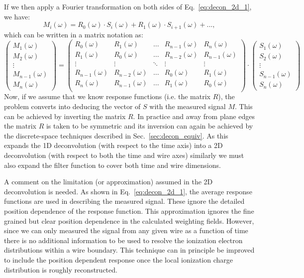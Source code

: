 If we then apply a Fourier transformation on both sides of Eq.~\ref{eq:decon_2d_1},
we have:
\begin{equation}\label{eq:decon_2d_2}
M_i(\omega) = R_0(\omega) \cdot S_i(\omega) + R_1(\omega) \cdot S_{i+1} (\omega) + ...,
\end{equation} 
which can be written in a matrix notation as:
\begin{equation}
\begin{pmatrix}
    M_1(\omega)\\
    M_2(\omega)\\
    \vdots\\
    M_{n-1}(\omega)\\
    M_{n}(\omega)
\end{pmatrix}
=
\begin{pmatrix}
R_0(\omega) & R_1(\omega) & \ldots & R_{n-1}(\omega) & R_n(\omega) \\
R_1(\omega) & R_0(\omega) & \ldots & R_{n-2}(\omega) & R_{n-1}(\omega) \\
    \vdots  & \vdots      & \ddots & \vdots          & \vdots \\
    R_{n-1}(\omega) & R_{n-2}(\omega) & \ldots & R_0(\omega) & R_1(\omega) \\
    R_{n}(\omega) & R_{n-1}(\omega) & \ldots & R_1(\omega) & R_0(\omega) \\
\end{pmatrix}
\cdot
\begin{pmatrix}
    S_1(\omega)\\
    S_2(\omega)\\
    \vdots\\
    S_{n-1}(\omega)\\
    S_{n}(\omega)
\end{pmatrix}
\label{eq:matrix_expansion}
\end{equation}
Now, if we assume that we know response functions (i.e. the matrix $R$), the 
problem converts into deducing the vector of $S$ with the measured signal $M$. 
%
This can be achieved by inverting the matrix $R$. In practice and away
from plane edges the matrix $R$ is taken to be symmetric and its
inversion can again be achieved by the discrete-space techniques
described in Sec.~\ref{sec:decon_equiv}.
%
As this expands the 1D deconvolution (with respect to the time axis)
into a 2D deconvolution (with respect to both the time and wire
axes) similarly we must also expand the filter function to cover
both time and wire dimensions.

A comment on the limitation (or approximation) 
assumed in the 2D deconvolution is needed. As shown in Eq.~\ref{eq:decon_2d_1}, the 
average response functions are used in describing the measured signal. These 
ignore the detailed position dependence of the response function. 
This approximation ignores the fine grained but clear position
dependence in the calculated weighting fields.
However, since we can only measured the signal from any given wire as
a function of time there is no additional information to be used to
resolve the ionization electron distributions within a wire boundary.
This technique can in principle be improved to include the position dependent
response once the local ionization charge distribution is roughly reconstructed. 

